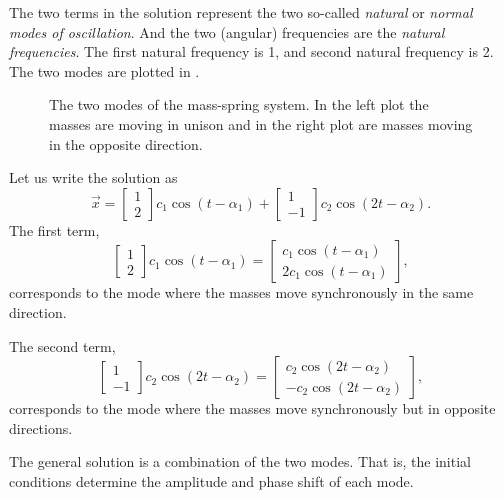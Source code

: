 \documentclass[12pt]{book}
\begin{document}
\begin{example}
The two terms in the solution represent the two
so-called \emph{natural}
or \emph{normal modes of oscillation}.
And the two (angular) frequencies are the
\emph{natural frequencies}.
The first natural frequency is 1, and second natural frequency is 2.
The two modes are plotted in .

\begin{figure}[h!t]
\capstart
\begin{center}
\qquad
{}
\caption{The two modes of the mass-spring system.  In the left plot
the masses are moving in unison and in the right plot are masses moving in the
opposite direction.\label{sosa:modesfig}}
\end{center}
\end{figure}

Let us write the solution as
\begin{equation*}
\vec{x} = 
\begin{bmatrix} 1 \\ 2 \end{bmatrix}
c_1 \cos (t - \alpha_1 )
+
\begin{bmatrix} 1 \\ -1 \end{bmatrix}
c_2 \cos (2t - \alpha_2 ) .
\end{equation*}
The first term,
\begin{equation*}
\begin{bmatrix} 1 \\ 2 \end{bmatrix}
c_1 \cos (t - \alpha_1 )
=
\begin{bmatrix}
c_1 \cos (t - \alpha_1 ) \\
2c_1 \cos (t - \alpha_1 )
\end{bmatrix} ,
\end{equation*}
corresponds to the mode where the masses move synchronously
in the same direction.

The second term,
\begin{equation*}
\begin{bmatrix} 1 \\ -1 \end{bmatrix}
c_2 \cos (2t - \alpha_2 )
=
\begin{bmatrix}
c_2 \cos (2t - \alpha_2 ) \\
- c_2 \cos (2t - \alpha_2 )
\end{bmatrix} ,
\end{equation*}
corresponds to the mode where the masses move synchronously
but in opposite directions.

The general solution is a combination of the two modes.  That is, the
initial conditions determine the amplitude and phase shift of each mode.
\end{example}
\end{document}
